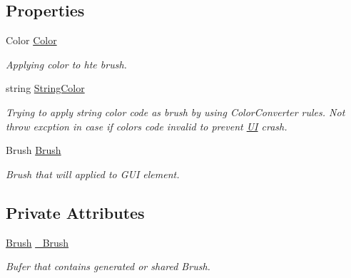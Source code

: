 \subsection*{Properties}
\begin{DoxyCompactItemize}
\item 
Color \mbox{\hyperlink{class_wpf_handler_1_1_u_i_1_1_color_attribute_a6c5c2202427bd48877142ecf85327843}{Color}}
\begin{DoxyCompactList}\small\item\em Applying color to hte brush. \end{DoxyCompactList}\item 
string \mbox{\hyperlink{class_wpf_handler_1_1_u_i_1_1_color_attribute_a2f09d55a6dfaf3912f2941910e1936e8}{String\+Color}}
\begin{DoxyCompactList}\small\item\em Trying to apply string color code as brush by using Color\+Converter rules. Not throw excption in case if color\textquotesingle{}s code invalid to prevent \mbox{\hyperlink{namespace_wpf_handler_1_1_u_i}{UI}} crash. \end{DoxyCompactList}\item 
Brush \mbox{\hyperlink{class_wpf_handler_1_1_u_i_1_1_color_attribute_afa14c4542d8023b3ddad6aba74993877}{Brush}}
\begin{DoxyCompactList}\small\item\em Brush that will applied to G\+UI element. \end{DoxyCompactList}\end{DoxyCompactItemize}
\subsection*{Private Attributes}
\begin{DoxyCompactItemize}
\item 
\mbox{\hyperlink{class_wpf_handler_1_1_u_i_1_1_color_attribute_afa14c4542d8023b3ddad6aba74993877}{Brush}} \mbox{\hyperlink{class_wpf_handler_1_1_u_i_1_1_color_attribute_ae25cb492c8efb5e3ff570452b618ee23}{\+\_\+\+Brush}}
\begin{DoxyCompactList}\small\item\em Bufer that contains generated or shared Brush. \end{DoxyCompactList}\end{DoxyCompactItemize}


